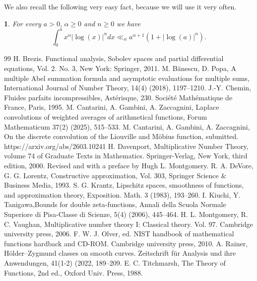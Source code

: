 \documentclass[10pt,a4paper]{amsart}
\numberwithin{equation}{section}
\numberwithin{figure}{section}
\newtheorem{prop}[thm]{\protect\propositionname}
\providecommand{\propositionname}{Proposition}
\begin{document}
We also recall the following very easy fact, because we will use it
very often.
\begin{prop}
\label{prop:trivial}For every $a>0,\,\alpha\geq0$ and $n\geq0$
we have
\[
\int_{0}^{a}x^{\alpha}\left|\log\left(x\right)\right|^{n}dx\ll_{n}a^{\alpha+1}\left(1+\left|\log\left(a\right)\right|^{n}\right).
\]
\end{prop}

\begin{thebibliography}{99}
 H. Brezis. Functional analysis, Sobolev spaces and partial differential equations, Vol. 2. No. 3, New York: Springer, 2011.
 M. B\u{a}nescu, D. Popa, A multiple Abel summation formula and asymptotic evaluations for multiple sums, International Journal of Number Theory, 14(4) (2018), 1197--1210.
 J.-Y. Chemin, Fluides parfaits incompressibles, Ast\'erisque, 230. Soci\'et\'e Math\'ematique de France, Paris, 1995.
 M. Cantarini, A. Gambini, A. Zaccagnini, Laplace convolutions of weighted averages of arithmetical functions, Forum Mathematicum 37(2) (2025), 515--533.
 M. Cantarini, A. Gambini, A. Zaccagnini, On the discrete convolution of the Liouville and M\"obius function, submitted. https://arxiv.org/abs/2603.10241
 H. Davenport, Multiplicative Number Theory, volume 74 of Graduate Texts in Mathematics. Springer-Verlag, New York, third edition, 2000. Revised and with a preface by Hugh L. Montgomery.
 R. A. DeVore, G. G. Lorentz, Constructive approximation, Vol. 303, Springer Science \& Business Media, 1993.
 S. G. Krantz, Lipschitz spaces, smoothness of functions, and approximation theory, Exposition. Math. 3 (1983), 193--260.
 I. Kiuchi, Y. Tanigawa,Bounds for double zeta-functions, Annali della Scuola Normale Superiore di Pisa-Classe di Scienze, 5(4) (2006), 445--464.
 H. L. Montgomery, R. C. Vaughan, Multiplicative number theory I: Classical theory. Vol. 97. Cambridge university press, 2006.
 F. W. J. Olver, ed. NIST handbook of mathematical functions hardback and CD-ROM. Cambridge university press, 2010.
 A. Rainer, H\"older--Zygmund classes on smooth curves. Zeitschrift f\"ur Analysis und ihre Anwendungen, 41(1-2) (2022, 189--209.
 E. C. Titchmarsh, The Theory of Functions, 2nd ed., Oxford Univ. Press, 1988.
\end{thebibliography}
\end{document}

